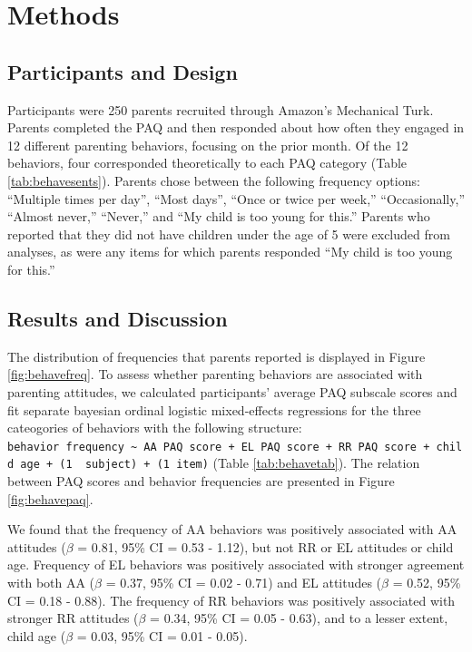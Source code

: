 \documentclass[floatsintext,man]{apa6}
\theoremstyle{definition}
\theoremstyle{definition}
\theoremstyle{definition}
\theoremstyle{remark}
\begin{document}
\section{Methods}\label{methods-1}

\subsection{Participants and Design}\label{participants-and-design-1}

Participants were 250 parents recruited through Amazon's Mechanical
Turk. Parents completed the PAQ and then responded about how often they
engaged in 12 different parenting behaviors, focusing on the prior
month. Of the 12 behaviors, four corresponded theoretically to each PAQ
category (Table \ref{tab:behavesents}). Parents chose between the
following frequency options: \enquote{Multiple times per day},
\enquote{Most days}, \enquote{Once or twice per week,}
\enquote{Occasionally,} \enquote{Almost never,} \enquote{Never,} and
\enquote{My child is too young for this.} Parents who reported that they
did not have children under the age of 5 were excluded from analyses, as
were any items for which parents responded \enquote{My child is too
young for this.}

\subsection{Results and Discussion}\label{results-and-discussion-1}

The distribution of frequencies that parents reported is displayed in
Figure \ref{fig:behavefreq}. To assess whether parenting behaviors are
associated with parenting attitudes, we calculated participants' average
PAQ subscale scores and fit separate bayesian ordinal logistic
mixed-effects regressions for the three cateogories of behaviors with
the following structure:
\texttt{behavior\ frequency\ \textasciitilde{}\ AA\ PAQ\ score\ +\ EL\ PAQ\ score\ +\ RR\ PAQ\ score\ +\ child\ age\ +\ (1\ \textbar{}\ subject)\ +\ (1\textbar{}\ item)}
(Table \ref{tab:behavetab}). The relation between PAQ scores and
behavior frequencies are presented in Figure \ref{fig:behavepaq}.

We found that the frequency of AA behaviors was positively associated
with AA attitudes (\(\beta\) = 0.81, 95\% CI = 0.53 - 1.12), but not RR
or EL attitudes or child age. Frequency of EL behaviors was positively
associated with stronger agreement with both AA (\(\beta\) = 0.37, 95\%
CI = 0.02 - 0.71) and EL attitudes (\(\beta\) = 0.52, 95\% CI = 0.18 -
0.88). The frequency of RR behaviors was positively associated with
stronger RR attitudes (\(\beta\) = 0.34, 95\% CI = 0.05 - 0.63), and to
a lesser extent, child age (\(\beta\) = 0.03, 95\% CI = 0.01 - 0.05).
\end{document}
